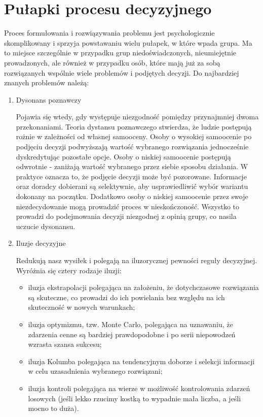 \section{Pułapki procesu decyzyjnego}
Proces formułowania i rozwiązywania problemu jest psychologicznie skomplikowany
i sprzyja powstawaniu wielu pułapek, w które wpada grupa. Ma to miejsce
szczególnie w przypadku grup niedoświadczonych, nieumiejętnie prowadzonych, ale 
również w przypadku osób, które mają już za sobą rozwiązanych wspólnie wiele 
problemów i podjętych decyzji.
Do najbardziej znanych problemów należą:
\begin{enumerate}
  \item Dysonans poznawczy
  
  Pojawia się wtedy, gdy występuje niezgodność pomiędzy przynajmniej dwoma przekonaniami. 
  Teoria dystansu poznawczego stwierdza, że ludzie postępują rożnie w zależności od własnej samooceny. 
  Osoby o wysokiej samoocenie po podjęciu decyzji podwyższają wartość wybranego rozwiązania 
  jednocześnie dyskredytując pozostałe opcje. Osoby o niskiej samoocenie
  postępują odwrotnie - zaniżają wartość wybranego przez siebie sposobu
  działania. W praktyce oznacza to, że podjęcie decyzji może być pozorowane. 
  Informacje oraz doradcy dobierani są selektywnie, aby usprawiedliwić wybór wariantu dokonany na początku. 
  Dodatkowo osoby o niskiej samoocenie przez swoje niezdecydowanie mogą prowadzić proces w nieskończoność. 
  Wszystko to prowadzi do podejmowania decyzji niezgodnej z opinią grupy, co nasila uczucie dysonansu.

  \item Iluzje decyzyjne
  
  Redukują nasz wysiłek i polegają na iluzorycznej pewności reguły decyzyjnej. Wyróżnia się cztery rodzaje iluzji:
  \begin{itemize}
    \item iluzja ekstrapolacji polegająca na założeniu, że dotychczasowe rozwiązania 
          są skuteczne, co prowadzi do ich powielania bez względu na ich
          skuteczność w nowych warunkach;
    \item iluzja optymizmu, tzw. Monte Carlo, polegająca na uznawaniu, że 
          zdarzenia cenne są bardziej prawdopodobne i po serii niepowodzeń
          wzrasta szansa sukcesu;
    \item iluzja Kolumba polegająca na tendencyjnym doborze i selekcji 
          informacji w celu uzasadnienia wybranego rozwiązani;
    \item iluzja kontroli polegająca na wierze w możliwość kontrolowania zdarzeń
          losowych (jeśli lekko rzucimy kostką to wypadnie mała liczba, a jeśli
          mocno to duża).
  \end{itemize}
  

\end{enumerate}
